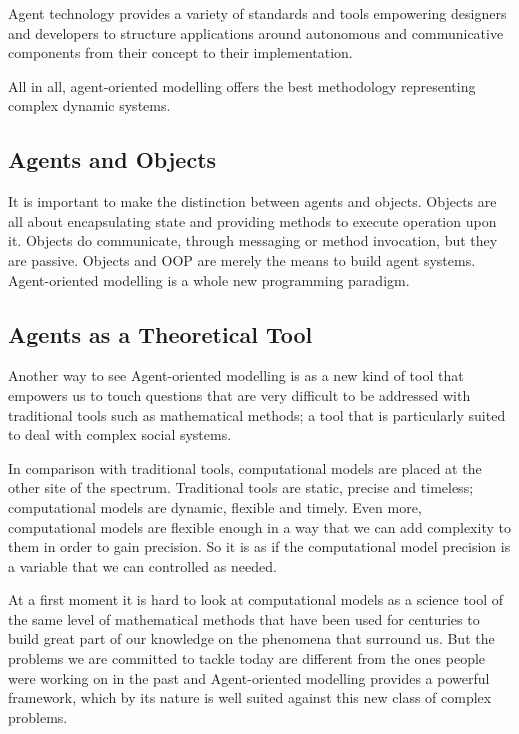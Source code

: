 Agent technology provides a variety of standards and tools empowering designers and developers to structure applications around autonomous and communicative components from their concept to their implementation. \cite{al3roadmap}

All in all, agent-oriented modelling offers the best methodology representing complex dynamic systems.

\subsection{Agents and Objects}

It is important to make the distinction between agents and objects. Objects are all about encapsulating state and providing methods to execute operation upon it. Objects do communicate, through messaging or method invocation, but they are passive. Objects and \ac{OOP} are merely the means to build agent systems. Agent-oriented modelling is a whole new programming paradigm. 

\subsection{Agents as a Theoretical Tool}

Another way to see Agent-oriented modelling is as a new kind of tool that empowers us to touch questions that are very difficult to be addressed with traditional tools such as mathematical methods; a tool that is particularly suited to deal with complex social systems.

In comparison with traditional tools, computational models are placed at the other site of the spectrum. Traditional tools are static, precise and timeless; computational models are dynamic, flexible and timely. Even more, computational models are flexible enough in a way that we can add complexity to them in order to gain precision. So it is as if the computational model precision is a variable that we can controlled as needed.

At a first moment it is hard to look at computational models as a science tool of the same level of mathematical methods that have been used for centuries to build great part of our knowledge on the phenomena that surround us. But the problems we are committed to tackle today are different from the ones people were working on in the past and Agent-oriented modelling provides a powerful framework, which by its nature is well suited against this new class of complex problems.

